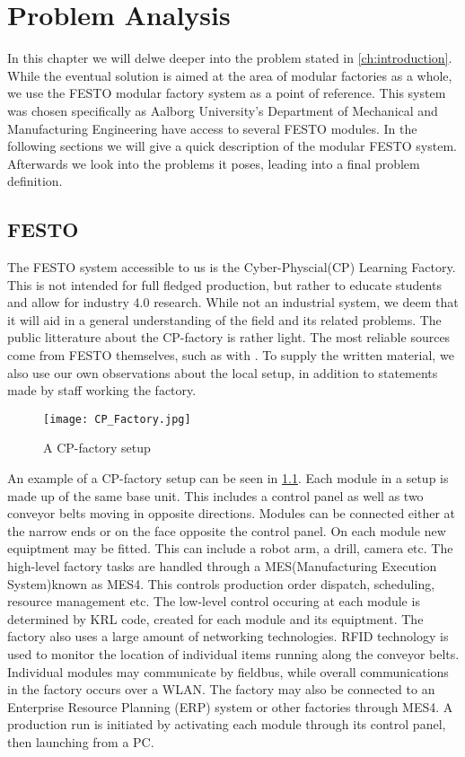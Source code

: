 \chapter{Problem Analysis}\label{ch:problemanalysis}
In this chapter we will delwe deeper into the problem stated in \cref{ch:introduction}. While the eventual solution is aimed at the area of modular factories as a whole, we use the FESTO modular factory system \cite{FESTOweb} as a point of reference. This system was chosen specifically as Aalborg University's Department of Mechanical and Manufacturing Engineering have access to several FESTO modules. In the following sections we will give a quick description of the modular FESTO system. Afterwards we look into the problems it poses, leading into a final problem definition.  

\section{FESTO}\label{sec:festo}
The FESTO system accessible to us is the Cyber-Physcial(CP) Learning Factory. This is not intended for full fledged production, but rather to educate students and allow for industry 4.0 research. While not an industrial system, we deem that it will aid in a general understanding of the field and its related problems. The public litterature about the CP-factory is rather light. The most reliable sources come from FESTO themselves, such as with \cite{CPFactory2015}. To supply the written material, we also use our own observations about the local setup, in addition to statements made by staff working the factory.  

\begin{figure}[h]
\centering
\texttt{[image: CP\_Factory.jpg]}
\caption{A CP-factory setup}
\label{fig:festo-example}
\end{figure}

An example of a CP-factory setup can be seen in \cref{fig:festo-example}. Each module in a setup is made up of the same base unit. This includes a control panel as well as two conveyor belts moving in opposite directions. Modules can be connected either at the narrow ends or on the face opposite the control panel. On each module new equiptment may be fitted. This can include a robot arm, a drill, camera etc. The high-level factory tasks are handled through a MES(Manufacturing Execution System)known as MES4. This controls production order dispatch, scheduling, resource management etc. The low-level control occuring at each module is determined by KRL code, created for each module and its equiptment. The factory also uses a large amount of networking technologies. RFID technology is used to monitor the location of individual items running along the conveyor belts. Individual modules may communicate by fieldbus, while overall communications in the factory occurs over a WLAN. The factory may also be connected to an Enterprise Resource Planning (ERP) system or other factories through MES4. A production run is initiated by activating each module through its control panel, then launching from a PC.

